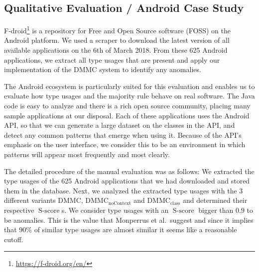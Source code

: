 \subsection{Qualitative Evaluation / Android Case Study}

F-droid\footnote{\url{https://f-droid.org/en/}} is a repository for Free and Open Source software (FOSS) on the Android platform.
We used a scraper to download the latest version of all available applications on the 6th of March 2018.
From these 625 Android applications, we extract all type usages that are present and apply our implementation of the $\text{DMMC}$ system to identify any anomalies.

The Android ecosystem is particularly suited for this evaluation and enables us to evaluate how type usages and the majority rule behave on real software.
The Java code is easy to analyze and there is a rich open source community, placing many sample applications at our disposal.
Each of these applications uses the Android API, so that we can generate a large dataset on the classes in the API, and detect any common patterns that emerge when using it.
Because of the API's emphasis on the user interface, we consider this to be an environment in which patterns will appear most frequently and most clearly.

The detailed procedure of the manual evaluation was as follows:
We extracted the type usages of the 625 Android applications that we had downloaded and stored them in the database.
Next, we analyzed the extracted type usages with the 3 different variants $\text{DMMC}$, $\text{DMMC}_{\text{noContext}}$ and $\text{DMMC}_{\text{class}}$ and determined their respective $\operatorname{S-score}$s.
We consider type usages with an $\operatorname{S-score}$ bigger than $0.9$ to be anomalies.
This is the value that Monperrus et al.\ suggest and since it implies that 90\% of similar type usages are almost similar it seems like a reasonable cutoff.

